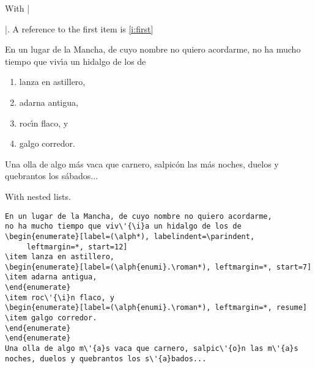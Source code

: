 \documentclass[a4paper]{ltxguide}
\begin{document}
\begin{enumerate}[leftmargin=*]
\begin{enumerate}[leftmargin=\parindent]
\begin{enumerate}[labelindent=\parindent,|\allowbreak
| leftmargin=*,|\allowbreak| label=\Roman*.,|\allowbreak
| widest=III,|\allowbreak| align=left]
\newsample

With |\begin{enumerate}[label=\fbox{\arabic*}]|. A reference to
the first item is \ref{i:first}

\samplesep

En un lugar de la Mancha, de cuyo nombre no quiero acordarme,
no ha mucho tiempo que viv\'{\i}a un hidalgo de los de
\begin{enumerate}[label=\fbox{\arabic*}]
\item \label{i:first}lanza en astillero,
\item adarna antigua,
\item roc\'{\i}n flaco, y
\item galgo corredor.
\end{enumerate}
Una olla de algo m\'{a}s vaca que carnero, salpic\'{o}n las m\'{a}s
noches, duelos y quebrantos los s\'{a}bados...

\newsample

With nested lists.

\samplesep

\begin{verbatim}
En un lugar de la Mancha, de cuyo nombre no quiero acordarme,
no ha mucho tiempo que viv\'{\i}a un hidalgo de los de
\begin{enumerate}[label=(\alph*), labelindent=\parindent,
     leftmargin=*, start=12]
\item lanza en astillero,
\begin{enumerate}[label=(\alph{enumi}.\roman*), leftmargin=*, start=7]
\item adarna antigua,
\end{enumerate}
\item roc\'{\i}n flaco, y
\begin{enumerate}[label=(\alph{enumi}.\roman*), leftmargin=*, resume]
\item galgo corredor.
\end{enumerate}
\end{enumerate}
Una olla de algo m\'{a}s vaca que carnero, salpic\'{o}n las m\'{a}s
noches, duelos y quebrantos los s\'{a}bados...
\end{verbatim}


\end{enumerate}
\end{enumerate}
\end{enumerate}
\end{enumerate}
\end{document}

